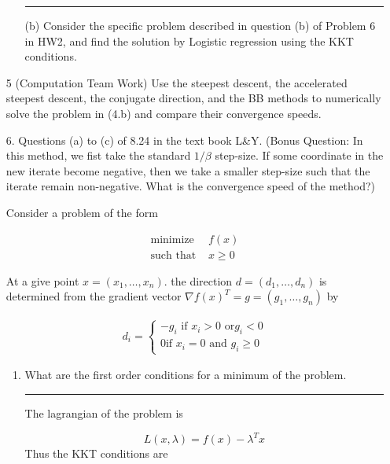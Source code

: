 \documentclass{article} %
\begin{document}
\begin{enumerate}
\begin{enumerate}
\rule{\textwidth}{1pt}

\item[(b)] Consider the specific problem described in question (b) of Problem 6 in HW2, and find the solution by
Logistic regression using the KKT conditions. 


\end{enumerate}

\item[5] (Computation Team Work) Use the steepest descent, the accelerated steepest descent, the conjugate direction, and the BB methods to numerically solve the problem in (4.b) and compare their convergence speeds.

\item[6.] Questions (a) to (c) of 8.24 in the text book L\&Y. (Bonus Question: In this method, we fist take the standard $1/\beta$ step-size. If some coordinate in the new iterate become negative, then we take a smaller step-size such that the iterate remain non-negative.  What is the convergence speed of the method?)




Consider a problem of the form 

\begin{equation*}
\begin{aligned}
\mbox{minimize } & f(x) \\ 
\mbox{such that } & x \geq 0
\end{aligned}
\end{equation*}

At a give point $x = (x_1, \hdots, x_n).$ the direction $d = (d_1, \hdots, d_n)$ is determined from the gradient vector $\nabla f(x)^T = g = (g_1, \hdots, g_n)$ by 

\begin{gather*}
d_i = \begin{cases} -g_i \mbox{ if } x_i > 0 \mbox{ or} g_i < 0 \\ 
0 \mbox {if } x_i = 0 \mbox{ and } g_i \geq 0 \end{cases}
\end{gather*}

\begin{enumerate}

\item  What are the first order conditions for a minimum of the problem. 


\rule{\textwidth}{1pt}


The lagrangian of the problem is 

\[
L(x, \lambda) = f(x) - \lambda^T x 
\]
Thus the KKT conditions are


\end{enumerate}
\end{enumerate}
\end{document}
